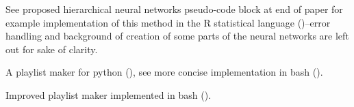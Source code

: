 

See proposed hierarchical neural networks pseudo-code block at end of paper for example implementation of this method in the R statistical language ()--error handling and background of creation of some parts of the neural networks are left out for sake of clarity.

A playlist maker for python (), see more concise implementation in bash ().

Improved playlist maker implemented in bash ().
